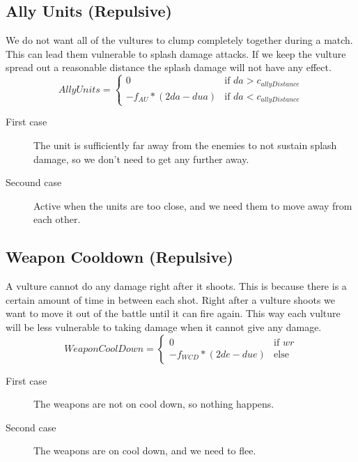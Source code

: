 	\subsection{Ally Units (Repulsive)}
We do not want all of the vultures to clump completely together during a match. This can lead them vulnerable to splash damage attacks. If we keep the vulture spread out a reasonable distance the splash damage will not have any effect.
		\begin{displaymath}
			AllyUnits = \begin{cases}
					0 & \text{if } da > c_{allyDistance}\\
					-f_{AU} * (2da - dua) & \text{if } da < c_{allyDistance}
				\end{cases}		
		\end{displaymath}
	\begin{description}	
		\item[First case] The unit is sufficiently far away from the enemies to not sustain splash damage, so we don't need to get any further away.
		\item[Secound case] Active when the units are too close, and we need them to move away from each other.
	\end{description}
	\subsection{Weapon Cooldown (Repulsive)}
A vulture cannot do any damage right after it shoots. This is because there is a certain amount of time in between each shot. Right after a vulture shoots we want to move it out of the battle until it can fire again. This way each vulture will be less vulnerable to taking damage when it cannot give any damage.
		\begin{displaymath}
			WeaponCoolDown = \begin{cases}
					0 & \text{if } wr\\
					-f_{WCD} * (2de - due) & \text{else}
				\end{cases}		
		\end{displaymath}

	\begin{description}	
		\item[First case] The weapons are not on cool down, so nothing happens. 
		\item[Second case] The weapons are on cool down, and we need to flee.        
    \end{description}	
